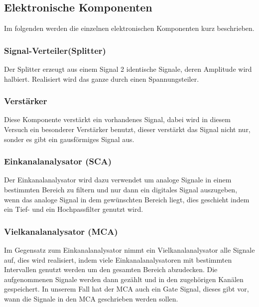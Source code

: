 \documentclass{article}
\begin{document}
\subsection*{Elektronische Komponenten}
Im folgenden werden die einzelnen elektronischen Komponenten kurz beschrieben.
\subsubsection*{Signal-Verteiler(Splitter)}
Der Splitter erzeugt aus einem Signal 2 identische Signale, deren Amplitude wird halbiert. 
Realisiert wird das ganze durch einen Spannungsteiler.
\subsubsection*{Verstärker}
Diese Komponente verstärkt ein vorhandenes Signal, dabei wird in diesem Versuch ein besonderer Verstärker benutzt, dieser verstärkt das Signal nicht nur, sonder es gibt ein gausförmiges Signal aus.
\subsubsection*{Einkanalanalysator (SCA)}
Der Einkanalanalysator wird dazu verwendet um analoge Signale in einem bestimmten Bereich zu filtern und nur dann ein digitales Signal auszugeben, wenn das analoge Signal in dem gewünschten Bereich liegt, dies geschieht indem ein Tief- und ein Hochpassfilter genutzt wird. 
\subsubsection*{Vielkanalanalysator (MCA)}
Im Gegensatz zum Einkanalanalysator nimmt ein Vielkanalanalysator alle Signale auf, dies wird realisiert, indem viele Einkanalanalysatoren mit bestimmten Intervallen genutzt werden um den gesamten Bereich abzudecken. 
Die aufgenommenen Signale werden dann gezählt und in den zugehörigen Kanälen gespeichert.
In unserem Fall hat der MCA auch ein Gate Signal, dieses gibt vor, wann die Signale in den MCA geschrieben werden sollen.
\end{document}
